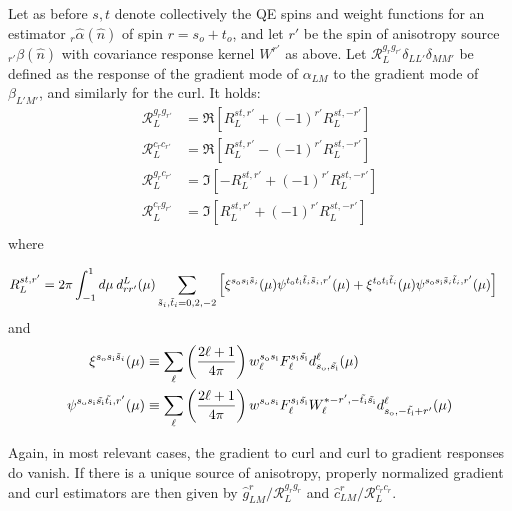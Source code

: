 \documentclass[reprint,prd, superscriptaddress, tightenlines, longbibliography, nofootinbib, eqsecnum, amsfonts, amsmath, floatfix, notitlepage, twocolumn]{revtex4-1}
\newcommand{\si}[0]{{s_{\rm i}}}
\newcommand{\ti}[0]{{t_{\rm i}}}
\newcommand{\so}[0]{{s_{\rm o}}}
\renewcommand{\to}[0]{{t_{\rm o}}}
\newcommand{\resp}{ {\mathcal R} }
\newcommand{\hn}[0]{\hat n}
\begin{document}
Let as before $s, t$ denote collectively the QE spins and weight functions for an estimator $_r\hat \alpha(\hn)$ of spin $r = s_o + t_o$, and let $r'$ be the spin of anisotropy source $_{r'}\beta(\hn)$ with covariance response kernel $W^{r'}$ as above. Let $\mathcal R_L^{g_r g_{r'}} \delta_{LL'}\delta_{MM'}$ be defined as the response of the gradient mode of $\alpha_{LM}$ to the gradient mode of $\beta_{L'M'}$, and similarly for the curl. It holds: \begin{equation}%
	\begin{split}
		\resp^{g_rg_{r'}}_L &= \Re\left[R_L^{st, r'} + (-1)^{r'} R_L^{st, -r'}\right]\\
		\resp^{c_rc_{r'}}_L &= \Re\left[R_L^{st, r'} - (-1)^{r'} R_L^{st, -r'}\right] \\
		\resp^{g_rc_{r'}}_L &= \Im\left[-R_L^{st, r'} + (-1)^{r'} R_L^{st, -r'} \right]  \\
		\resp^{c_rg_{r'}}_L &= \Im\left[R_L^{st, r'} + (-1)^{r'} R_L^{st, -r'} \right] \\
	\end{split}
\end{equation}
where
\begin{widetext}
\begin{equation}
\begin{split}
R_L^{st, r'} &= 2\pi  \int_{-1}^1 d \mu\: d^L_{rr'}(\mu)\sum_{\tilde s_i,\tilde t_i = 0,2,-2}  \left[\xi^{\so \si \tilde s_i} (\mu)\psi^{\to \ti \tilde t_i \tilde s_i, r' }(\mu) +  \xi^{\to \ti \tilde t_i}(\mu) \psi^{\so \si \tilde s_i \tilde t_i, r' }(\mu) \right]
\end{split}
\end{equation}
and
\begin{equation}
\begin{split}
\xi^{\so\si \tilde s_i}(\mu) &\equiv  \sum_\ell \left(\frac{2\ell + 1}{4\pi}\right)w^{\so\si}_\ell F_\ell^{\si \tilde \si} d^\ell_{\so,\tilde \si}(\mu) 
\\
\psi^{\so\si \tilde \si \tilde \ti, r'}(\mu) &\equiv \sum_\ell \left(\frac{2\ell + 1}{4\pi}\right)w^{\so \si}F^{\si \tilde \si}_\ell W_\ell^{*-r', -\tilde \ti \tilde \si} d^\ell_{\so,-\tilde \ti + r'}(\mu) 
\end{split}
\end{equation}
	
\end{widetext}
Again, in most relevant cases, the gradient to curl and curl to gradient responses do vanish. If there is a unique source of anisotropy, properly normalized gradient and curl estimators are then given by $\hat g^r_{LM} / \mathcal R_L^{g_rg_r}$ and $\hat c^r_{LM} / \mathcal R_L^{c_r c_r}$.
\end{document}

